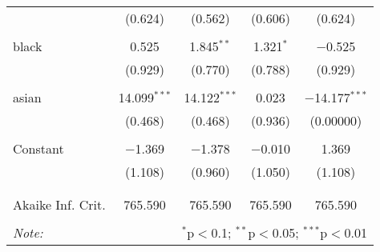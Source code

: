 \begin{table}[!htbp]
\begin{tabular}{@{\extracolsep{5pt}}lcccc}
  & (0.624) & (0.562) & (0.606) & (0.624) \\ 
  & & & & \\ 
 black & 0.525 & 1.845$^{**}$ & 1.321$^{*}$ & $-$0.525 \\ 
  & (0.929) & (0.770) & (0.788) & (0.929) \\ 
  & & & & \\ 
 asian & 14.099$^{***}$ & 14.122$^{***}$ & 0.023 & $-$14.177$^{***}$ \\ 
  & (0.468) & (0.468) & (0.936) & (0.00000) \\ 
  & & & & \\ 
 Constant & $-$1.369 & $-$1.378 & $-$0.010 & 1.369 \\ 
  & (1.108) & (0.960) & (1.050) & (1.108) \\ 
  & & & & \\ 
\hline \\[-1.8ex] 
Akaike Inf. Crit. & 765.590 & 765.590 & 765.590 & 765.590 \\ 
\hline 
\hline \\[-1.8ex] 
\textit{Note:}  & \multicolumn{4}{r}{$^{*}$p$<$0.1; $^{**}$p$<$0.05; $^{***}$p$<$0.01} \\ 
\end{tabular} 
\end{table} 